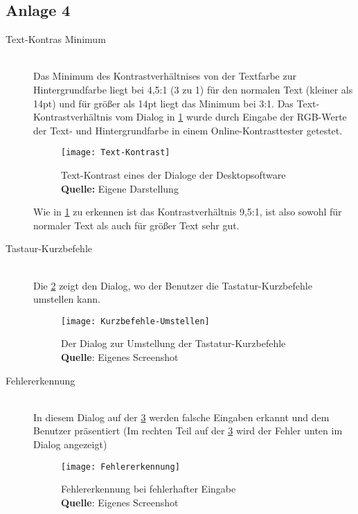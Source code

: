 \subsection*{Anlage 4}
\label{subsec: Anlage4}

\begin{description}
	\item[Text-Kontras Minimum] \hfill \\
	Das Minimum des Kontrastverhältnises von der Textfarbe zur Hintergrundfarbe liegt bei 4,5:1 (3 zu 1) für den normalen Text (kleiner als 14pt) und für größer als 14pt liegt das Minimum bei 3:1. 
	Das Text-Kontrastverhältnis vom Dialog in \cref{fig: Text-Kontrast} wurde durch Eingabe der RGB-Werte der Text- und Hintergrundfarbe in einem Online-Kontrasttester getestet.
	
	\begin{figure}[H]
		\centering
		\texttt{[image: Text-Kontrast]}
		\caption[Text-Kontrast eines der Dialoge der Desktopsoftware]{Text-Kontrast eines der Dialoge der Desktopsoftware\\\textbf{Quelle:} Eigene Darstellung}
		\label{fig: Text-Kontrast}
	\end{figure}
	
	Wie in \cref{fig: Text-Kontrast} zu erkennen ist das Kontrastverhältnis 9,5:1, ist also sowohl für normaler Text als auch für größer Text sehr gut.
	
	\item[Tastaur-Kurzbefehle] \hfill \\
	Die \cref{fig: Kurzbefehle-Umstellen} zeigt den Dialog, wo der Benutzer die Tastatur-Kurzbefehle umstellen kann.
	
	\begin{figure}[H]
		\centering
		\texttt{[image: Kurzbefehle-Umstellen]}
		\caption[Der Dialog zur Umstellung der Tastatur-Kurzbefehle]{Der Dialog zur Umstellung der Tastatur-Kurzbefehle\\\textbf{Quelle}: Eigenes Screenshot}
		\label{fig: Kurzbefehle-Umstellen}
	\end{figure}
	
	\item[Fehlererkennung] \hfill \\
	In diesem Dialog auf der \cref{fig: Fehlererkennung} werden falsche Eingaben erkannt und dem Benutzer präsentiert (Im rechten Teil auf der \cref{fig: Fehlererkennung} wird der 
	Fehler unten im Dialog angezeigt)
	
	\begin{figure}[H]
		\centering
		\texttt{[image: Fehlererkennung]}
		\caption[Fehlererkennung bei fehlerhafter Eingabe]{Fehlererkennung bei fehlerhafter Eingabe\\\textbf{Quelle}: Eigenes Screenshot}
		\label{fig: Fehlererkennung}
	\end{figure}
	

\end{description}
